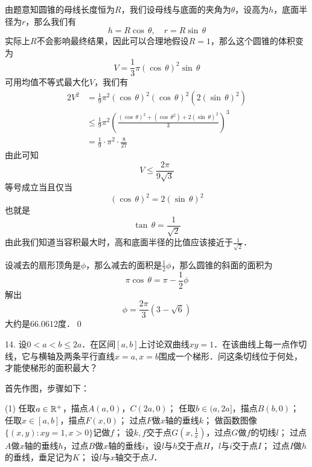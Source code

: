 \solve 由题意知圆锥的母线长度恒为$R$，我们设母线与底面的夹角为$\theta$，设高为$h$，底面半径为$r$，那么我们有
\begin{equation}
    h = R \cos \, \theta, \quad r = R \sin \, \theta
\end{equation}
实际上$R$不会影响最终结果，因此可以合理地假设$R=1$，那么这个圆锥的体积变为
\begin{equation}
    V = \frac{1}{3} \pi \left(\cos \, \theta\right)^2 \sin \, \theta
\end{equation}
可用均值不等式最大化$V$，我们有
\begin{align}
    2V^2 &= \frac{1}{9} \pi^2 \left( \cos \, \theta \right)^2 \left( \cos \, \theta \right)^2 \left(2 \left( \sin \, \theta \right)^2\right) \\
    &\leq \frac{1}{9} \pi^2 \left(\frac{\left(\cos \, \theta\right)^2 + \left(\cos \, \theta^2\right) + 2 \left(\sin \, \theta\right)^2}{3}\right)^3 \\
    &= \frac{1}{9} \cdot \pi^2 \cdot \frac{8}{27}
\end{align}
由此可知
\begin{equation}
    V \leq \frac{2 \pi}{9 \sqrt{3}}
\end{equation}
等号成立当且仅当
\begin{equation}
    \left( \cos \, \theta \right)^2 = 2 \left( \sin \, \theta \right)^2
\end{equation}
也就是
\begin{equation}
    \tan \, \theta = \frac{1}{\sqrt{2}}
\end{equation}
由此我们知道当容积最大时，高和底面半径的比值应该接近于$\displaystyle\frac{1}{\sqrt{2}}$．

设减去的扇形顶角是$\phi$，那么减去的面积是$\displaystyle\frac{1}{2}\phi$，那么圆锥的斜面的面积为
\begin{equation}
    \pi \cos \, \theta = \pi - \frac{1}{2} \phi
\end{equation}
解出
\begin{equation}
    \phi = \frac{2 \pi}{3} \left(3-\sqrt{6}\right) 
\end{equation}
大约是$66.0612$度．\qed\bigskip

14. 设$0 < a < b \leq 2a$．在区间$[a,b]$上讨论双曲线$xy=1$．在该曲线上每一点作切线，它与横轴及两条平行直线$x=a,x=b$围成一个梯形．问这条切线位于何处，才能使梯形的面积最大？

\solve 首先作图，步骤如下：
\begin{tasks}(1)
    \task 任取$a \in \mathbb{R}^{+}$，描点$A(a,0)$，$C(2a,0)$；
    \task 任取$b \in (a, 2a]$，描点$B(b,0)$；
    \task 任取$x \in [a,b]$，描点$F(x,0)$；
    \task 过点$F$做$x$轴的垂线$k$；
    \task 做函数图像$\{ (x,y) : xy=1, x > 0\}$记做$f$；
    \task 设$k,f$交于点$G(x, \displaystyle\frac{1}{x})$，过点$G$做$f$的切线$l$；
    \task 过点$A$做$x$轴的垂线$h$，过点$B$做$x$轴的垂线$i$，设$l$与$h$交于点$H$，$l$与$i$交于点$I$；
    \task 过点$I$做$h$的垂线，垂足记为$K$；
    \task 设$l$与$x$轴交于点$J$．
\end{tasks}

